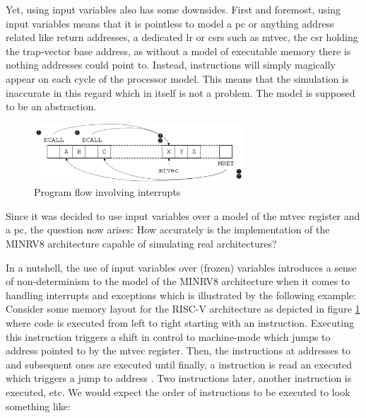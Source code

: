 Yet, using input variables also has some downsides.
First and foremost, using input variables means that it is pointless to model a \gls{pc} or anything address related like return addresses, a dedicated \gls{lr} or \glspl{csr} such as \gls{mtvec}, the \gls{csr} holding the trap-vector base address, as without a model of executable memory there is nothing addresses could point to.
Instead, instructions will simply magically appear on each cycle of the processor model.
This means that the simulation is inaccurate in this regard which in itself is not a problem.
The model is supposed to be an abstraction.

\begin{figure}
    \centering
    \includegraphics[width=0.7\textwidth]{figures/interrupt-flow.png}
    \caption{Program flow involving interrupts}
    \label{fig:interrupt-flow}
\end{figure}

Since it was decided to use input variables over a model of the \gls{mtvec} register and a \gls{pc}, the question now arises: How accurately is the implementation of the MINRV8 architecture capable of simulating real architectures?

In a nutshell, the use of input variables over (frozen) variables introduces a sense of non-determinism to the model of the MINRV8 architecture when it comes to handling interrupts and exceptions which is illustrated by the following example:
Consider some memory layout for the RISC-V architecture as depicted in figure \ref{fig:interrupt-flow} where code is executed from left to right starting with an  instruction.
Executing this instruction triggers a shift in control to machine-mode which jumps to address  pointed to by the \gls{mtvec} register.
Then, the instructions at addresses  to  and subsequent ones are executed until finally, a  instruction is read an executed which triggers a jump to address .
Two instructions later, another  instruction is executed, etc.
We would expect the order of instructions to be executed to look something like:

